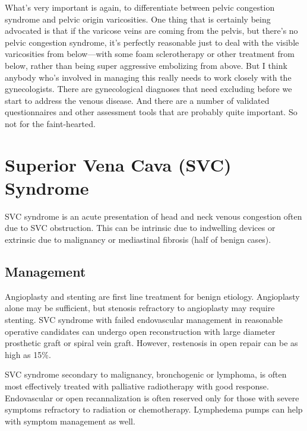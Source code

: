 \documentclass[
]{book}
\begin{document}
What's very important is again, to differentiate between pelvic
congestion syndrome and pelvic origin varicosities. One thing that is
certainly being advocated is that if the varicose veins are coming from
the pelvis, but there's no pelvic congestion syndrome, it's perfectly
reasonable just to deal with the visible varicosities from below---with
some foam sclerotherapy or other treatment from below, rather than being
super aggressive embolizing from above. But I think anybody who's
involved in managing this really needs to work closely with the
gynecologists. There are gynecological diagnoses that need excluding
before we start to address the venous disease. And there are a number of
validated questionnaires and other assessment tools that are probably
quite important. So not for the faint-hearted.

\hypertarget{superior-vena-cava-svc-syndrome}{%
\section{Superior Vena Cava (SVC) Syndrome}\label{superior-vena-cava-svc-syndrome}}

SVC syndrome is an acute presentation of head and neck venous congestion
often due to SVC obstruction. This can be intrinsic due to indwelling
devices or extrinsic due to malignancy or mediastinal fibrosis (half of
benign cases).\citep{kalra2019, rice2006, parish1981}

\hypertarget{management-32}{%
\subsection{Management}\label{management-32}}

Angioplasty and stenting are first line treatment for benign
etiology.\citep{rizvi2008, sheikh2005} Angioplasty alone may be sufficient,
but stenosis refractory to angioplasty may require stenting. SVC
syndrome with failed endovascular management in reasonable operative
candidates can undergo open reconstruction with large diameter
prosthetic graft or spiral vein graft.\citep{doty1999} However, restenosis in
open repair can be as high as 15\%.\citep{kalra2018, sfyroeras2017}

SVC syndrome secondary to malignancy, bronchogenic or lymphoma, is often
most effectively treated with palliative radiotherapy with good
response.\citep{talapatra2016} Endovascular or open recannalization is often
reserved only for those with severe symptoms refractory to radiation or
chemotherapy.\citep{higdon2006} Lymphedema pumps can help with symptom
management as well.
\end{document}
